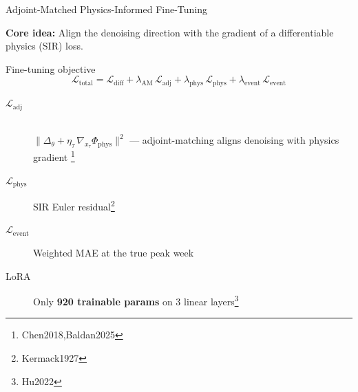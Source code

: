 \documentclass[10pt]{beamer}
\newcommand{\papercite}[1]{\footnote{\tiny #1}}
\begin{document}
\begin{frame}{Adjoint-Matched Physics-Informed Fine-Tuning}

  \textbf{Core idea:} Align the denoising direction with the gradient of
  a differentiable physics (SIR) loss.

  \vspace{0.3cm}
  \begin{block}{Fine-tuning objective}
    \[
      \mathcal{L}_{\text{total}} = \mathcal{L}_{\text{diff}}
      + \lambda_{\text{AM}}\,\mathcal{L}_{\text{adj}}
      + \lambda_{\text{phys}}\,\mathcal{L}_{\text{phys}}
      + \lambda_{\text{event}}\,\mathcal{L}_{\text{event}}
    \]
  \end{block}

  \begin{description}
    \item[$\mathcal{L}_{\text{adj}}$] \hfill \\
      $\displaystyle\big\|\Delta_\theta + \eta_\tau\,\nabla_{x_\tau}\Phi_{\text{phys}}\big\|^2$
      --- adjoint-matching aligns denoising with physics gradient
      \papercite{Chen2018,Baldan2025}
    \item[$\mathcal{L}_{\text{phys}}$] SIR Euler residual\papercite{Kermack1927}
    \item[$\mathcal{L}_{\text{event}}$] Weighted MAE at the true peak week
    \item[LoRA] Only \textbf{920 trainable params} on 3 linear
      layers\papercite{Hu2022}
  \end{description}

\end{frame}
\end{document}
